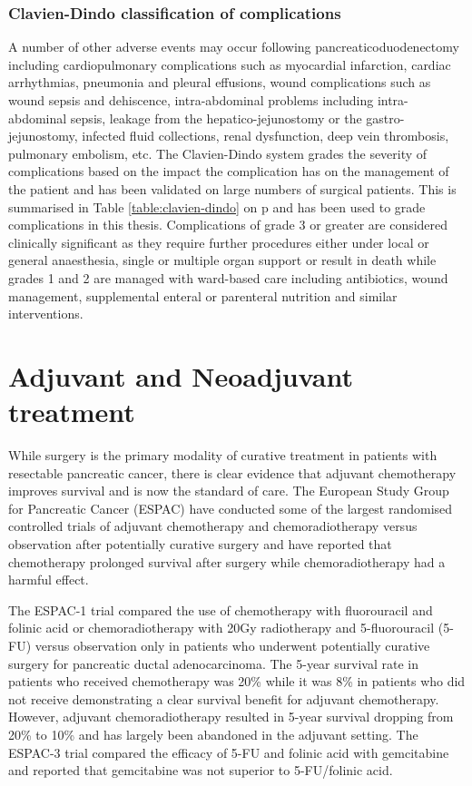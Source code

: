 \subsubsection{Clavien-Dindo classification of complications}

A number of other adverse events may occur following pancreaticoduodenectomy including cardiopulmonary complications such as myocardial infarction, cardiac arrhythmias, pneumonia and pleural effusions, wound complications such as wound sepsis and dehiscence, intra-abdominal problems including intra-abdominal sepsis, leakage from the hepatico-jejunostomy or the gastro-jejunostomy, infected fluid collections, renal dysfunction, deep vein thrombosis, pulmonary embolism, etc. The Clavien-Dindo system grades the severity of complications based on the impact the complication has on the management of the patient and has been validated on large numbers of surgical patients.\parencite{clavien_clavien-dindo_2009, dindo_classification_2004} This is summarised in Table \ref{table:clavien-dindo} on p\pageref{table:clavien-dindo} and has been used to grade complications in this thesis. Complications of grade 3 or greater are considered clinically significant as they require further procedures either under local or general anaesthesia, single or multiple organ support or result in death while grades 1 and 2 are managed with ward-based care including antibiotics, wound management, supplemental enteral or parenteral nutrition and similar interventions.

\section{Adjuvant and Neoadjuvant treatment}

While surgery is the primary modality of curative treatment in patients with resectable pancreatic cancer, there is clear evidence that adjuvant chemotherapy improves survival and is now the standard of care. The European Study Group for Pancreatic Cancer (ESPAC) have conducted some of the largest randomised controlled trials of adjuvant chemotherapy and chemoradiotherapy versus observation after potentially curative surgery and have reported that chemotherapy prolonged survival after surgery while chemoradiotherapy had a harmful effect. \parencite{neoptolemos_adjuvant_2001, neoptolemos_randomized_2004, neoptolemos_adjuvant_2009, neoptolemos_adjuvant_2010} 

The ESPAC-1 trial compared the use of chemotherapy with fluorouracil and folinic acid or chemoradiotherapy with 20Gy radiotherapy and 5-fluorouracil (5-FU) versus observation only in patients who underwent potentially curative surgery for pancreatic ductal adenocarcinoma. The 5-year survival rate in patients who received chemotherapy was 20\% while it was 8\% in patients who did not receive demonstrating a clear survival benefit for adjuvant chemotherapy. However, adjuvant chemoradiotherapy resulted in 5-year survival dropping from 20\% to 10\% and has largely been abandoned in the adjuvant setting. The ESPAC-3 trial compared the efficacy of 5-FU and folinic acid with gemcitabine and reported that gemcitabine was not superior to 5-FU/folinic acid.

